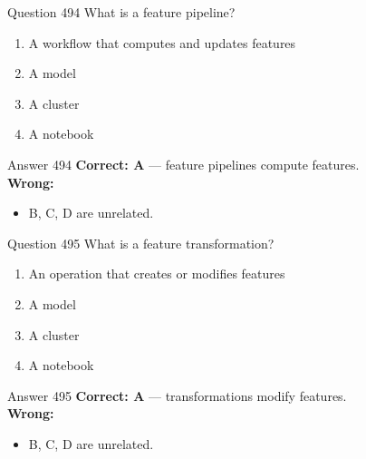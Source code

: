 \documentclass[aspectratio=169,11pt]{beamer}
\begin{document}
	\begin{frame}{Question 494}
		What is a feature pipeline?
		\begin{enumerate}[label=\Alph*.]
			\item A workflow that computes and updates features
			\item A model
			\item A cluster
			\item A notebook
		\end{enumerate}
	\end{frame}
	\begin{frame}{Answer 494}
		\textbf{Correct: A} --- feature pipelines compute features.\\
		\vspace{0.5em}
		\textbf{Wrong:}
		\begin{itemize}
			\item B, C, D are unrelated.
		\end{itemize}
	\end{frame}
	
	\begin{frame}{Question 495}
		What is a feature transformation?
		\begin{enumerate}[label=\Alph*.]
			\item An operation that creates or modifies features
			\item A model
			\item A cluster
			\item A notebook
		\end{enumerate}
	\end{frame}
	\begin{frame}{Answer 495}
		\textbf{Correct: A} --- transformations modify features.\\
		\vspace{0.5em}
		\textbf{Wrong:}
		\begin{itemize}
			\item B, C, D are unrelated.
		\end{itemize}
	\end{frame}
	
\end{document}
